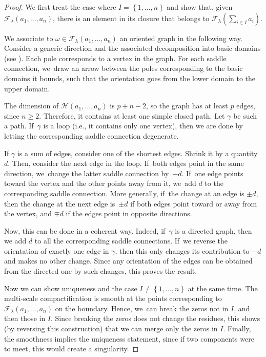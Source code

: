 \documentclass[11pt]{article}
\newcommand{\ie}{i.e.,\xspace}
\theoremstyle{definition}
\begin{document}
\begin{proof}
We first treat the case where $I=\left\{1,\dots,n\right\}$ and show that, given $\mathcal{F}_{\lambda}(a_{1},\dots,a_{n})$, there is an element in its closure that belongs to $\mathcal{F}_{\lambda}(\sum_{i\in I} a_{i})$.

We associate to $\omega\in \mathcal{F}_{\lambda}(a_{1},\dots,a_{n})$ an oriented graph in the following way. Consider a generic direction and the associated decomposition into basic domains (see \cite[\S 3.3]{Bo}). Each pole corresponds to a vertex in the graph. For each saddle connection, we~draw an arrow between the poles corresponding to the basic domains it bounds, such that the orientation goes from the lower domain to the upper domain.

The dimension of $\mathcal{H}(a_{1},\dots,a_{n})$ is $p+n-2$, so the graph has at least $p$ edges, since $n\geq2$. Therefore, it contains at least one simple closed path. Let $\gamma$ be such a path. If~$\gamma$ is a loop (\ie it contains only one vertex), then we are done by letting the corresponding saddle connection degenerate.

If $\gamma$ is a sum of edges, consider one of the shortest edges. Shrink it by a quantity $d$. Then, consider the next edge in the loop. If~both edges point in the same direction, we~change the latter saddle connection by~$-d$. If~one edge points toward the vertex and the other points away from it, we~add $d$ to the corresponding saddle connection. More generally, if~the change at an edge is $\pm d$, then the change at the next edge is~$\pm d$ if both edges point toward or away from the vertex, and $\mp d$ if the edges point in opposite directions.

Now, this can be done in a coherent way. Indeed, if~$\gamma$ is a directed graph, then we add $d$ to all the corresponding saddle connections. If~we reverse the orientation of exactly one edge in $\gamma$, then this only changes its contribution to $-d$ and makes no other change. Since any orientation of the edges can be obtained from the directed one by such changes, this proves the result.

Now we can show uniqueness and the case $I \neq \left\{1,\dots,n\right\}$ at the same time. The multi-scale compactification is smooth at the points corresponding to $\mathcal{F}_{\lambda}(a_{1},\dots,a_{n})$ on the boundary. Hence, we~can break the zeros not in $I$, and then those in $I$. Since breaking the zeros does not change the residues, this shows (by reversing this construction) that we can merge only the zeros in $I$. Finally, the smoothness implies the uniqueness statement, since if two components were to meet, this would create a singularity.
\end{proof}
\end{document}
